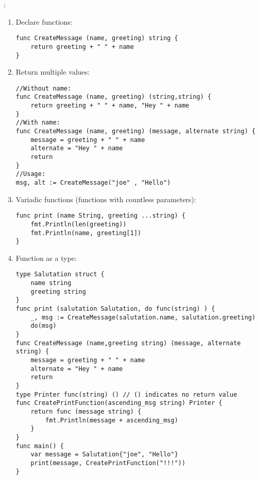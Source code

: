 \begin{note}[Functions]:
	\begin{enumerate}
		\item Declare functions:
\begin{lstlisting}[language = {Golang}]
func CreateMessage (name, greeting) string {
	return greeting + " " + name
}
\end{lstlisting}		
		\item Return multiple values:
\begin{lstlisting}[language = {Golang}]
//Without name:
func CreateMessage (name, greeting) (string,string) {
	return greeting + " " + name, "Hey " + name
}
//With name:
func CreateMessage (name, greeting) (message, alternate string) {
	message = greeting + " " + name
	alternate = "Hey " + name
	return
}
//Usage:
msg, alt := CreateMessage("joe" , "Hello")
\end{lstlisting}
		\item Variadic functions (functions with countless parameters):
\begin{lstlisting}[language = {Golang}]
func print (name String, greeting ...string) {	
	fmt.Println(len(greeting))
	fmt.Println(name, greeting[1])	
}
\end{lstlisting}
		\item Function as a type:
\begin{lstlisting}[language = {Golang}]
type Salutation struct {
	name string
	greeting string	
}
func print (salutation Salutation, do func(string) ) {	
	_, msg := CreateMessage(salutation.name, salutation.greeting)	
	do(msg)
}
func CreateMessage (name,greeting string) (message, alternate string) {
	message = greeting + " " + name
	alternate = "Hey " + name
	return
}
type Printer func(string) () // () indicates no return value
func CreatePrintFunction(ascending_msg string) Printer {
	return func (message string) {
		fmt.Println(message + ascending_msg)
	}
}
func main() {
	var message = Salutation{"joe", "Hello"}
	print(message, CreatePrintFunction("!!!"))
}
\end{lstlisting}	
	\end{enumerate}
\end{note}
